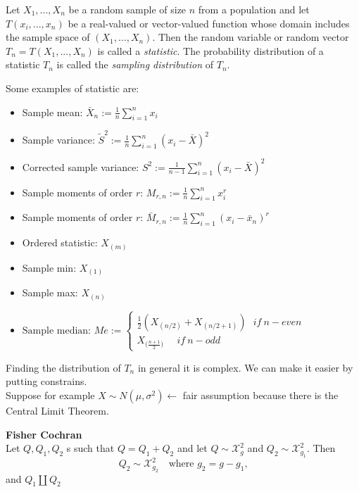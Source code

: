 \begin{defi}
	Let $X_1 , ... , X_n$ be a random sample of size $n$ from a population and let $T(x_i, ... ,x_n)$ be a real-valued or vector-valued function whose domain includes
	the sample space of $(X_1, ... , X_n)$. Then the random variable or random vector
	$T_n = T(X_1, ... ,X_n)$ is called a \textit{statistic}. The probability distribution of a statistic $T_n$	is called the \textit{sampling distribution} of $T_n$.
\end{defi}
Some examples of statistic are:
\begin{itemize}
	\item Sample mean: $\bar X_n:=\frac{1}{n} \sum_{i=1}^n x_i$
	\item Sample variance: $\tilde S^2:=\frac{1}{n} \sum_{i=1}^n (x_i - \bar X )^2 $
	\item Corrected sample variance: $S^2:=\frac{1}{n-1} \sum_{i=1}^n (x_i - \bar X )^2 $
	\item Sample moments of order $r$: $M_{r,n}:=\frac{1}{n}\sum_{i=1}^{n}x_i^r$
	\item Sample moments of order $r$: $\bar M_{r,n}:=\frac{1}{n}\sum_{i=1}^{n}(x_i-\bar x_n)^r$
	\item Ordered statistic: $X_{(m)}$
	\item Sample min: $X_{(1)}$
	\item Sample max: $X_{(n)}$
	\item  
	$
	\text{Sample median:   }	Me:=\begin{cases}
	\frac{1}{2}(X_{(n/2)}+X_{(n/2+1)}) \ \ \ if \ n-even\\
	X_{\big(\frac{n+1}{2}\big)}\ \ \ \ \ \  if \ n-odd
	\end{cases}
	$
\end{itemize}
Finding the distribution of $T_n$ in general it is complex. We can make it easier by putting constrains.\\
Suppose for example $X\sim N(\mu, \sigma^2)\leftarrow$ fair assumption because there is the Central Limit Theorem.
\begin{teo}\textbf{Fisher Cochran}\\
	\label{teo:fishC}
	Let $Q,Q_1,Q_2$ \rv s such that $Q=Q_1+Q_2$ and let $Q\sim \mathcal{X}_{g}^2$ and $Q_2\sim\mathcal{X}_{g_1}^2$. Then
	$$Q_2\sim \mathcal{X}_{g_2}^2 \ \ \ \text{       where $g_2=g-g_1$,}$$
	and $Q_1 \coprod Q_2$
\end{teo}


